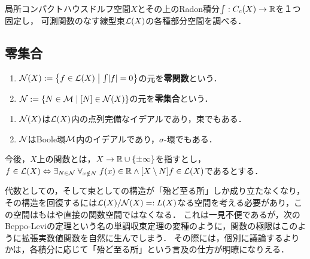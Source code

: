 \documentclass[uplatex,dvipdfmx]{jsreport}
\begin{document}
\begin{tcolorbox}[colframe=ForestGreen, colback=ForestGreen!10!white,breakable,colbacktitle=ForestGreen!40!white,coltitle=black,fonttitle=\bfseries\sffamily,
title=]
    局所コンパクトハウスドルフ空間$X$とその上のRadon積分$\int:C_c(X)\to\mathbb{R}$を１つ固定し，
    可測関数のなす線型束$\mathcal{L}(X)$の各種部分空間を調べる．
\end{tcolorbox}

\subsection{零集合}

\begin{definition}\mbox{}\label{def-null-set}
    \begin{enumerate}
        \item $\mathcal{N}(X):=\left\{f\in\mathcal{L}(X)\;\middle|\;\int\lvert f\rvert=0\right\}$の元を\textbf{零関数}という．
        \item $\mathcal{N}:=\left\{N\in\mathcal{M}\mid[N]\in\mathcal{N}(X)\right\}$の元を\textbf{零集合}という．
    \end{enumerate}
\end{definition}

\begin{lemma}\mbox{}
    \begin{enumerate}
        \item $\mathcal{N}(X)$は$\mathcal{L}(X)$内の点列完備なイデアルであり，束でもある．
        \item $\mathcal{N}$はBoole環$\mathcal{M}$内のイデアルであり，$\sigma$-環でもある．
    \end{enumerate}
\end{lemma}

\begin{definition}
    今後，$X$上の関数とは，$X\to\mathbb{R}\cup\{\pm\infty\}$を指すとし，$f\in\mathcal{L}(X)\Leftrightarrow\exists_{N\in\mathcal{N}}\;\forall_{x\notin N}\;f(x)\in\mathbb{R}\land[X\setminus N]f\in\mathcal{L}(X)$であるとする．
\end{definition}
\begin{remarks}
    代数としての，そして束としての構造が「殆ど至る所」しか成り立たなくなり，その構造を回復するには$\mathcal{L}(X)/\mathcal{N}(X)=:L(X)$なる空間を考える必要があり，この空間はもはや直接の関数空間ではなくなる．
    これは一見不便であるが，次のBeppo-Leviの定理という名の単調収束定理の変種のように，関数の極限はこのように拡張実数値関数を自然に生んでしまう．
    その際には，個別に議論するよりかは，各積分に応じて「殆ど至る所」という言及の仕方が明瞭になりえる．
\end{remarks}
\end{document}
